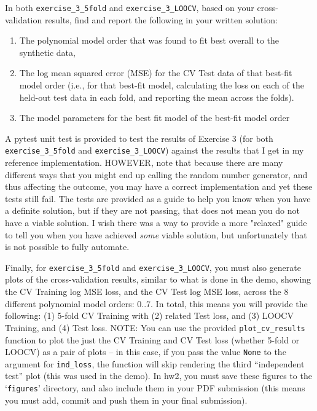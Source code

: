 \documentclass[10pt]{article}
\begin{document}
\begin{itemize}
In both {\tt exercise\_3\_5fold} and {\tt exercise\_3\_LOOCV}, based on your cross-validation results, find and report the following in your written solution:
\begin{enumerate}
\item The polynomial model order that was found to fit best overall to the synthetic data,
\item The log mean squared error (MSE) for the CV Test data of that best-fit model order (i.e., for that best-fit model, calculating the loss on each of the held-out test data in each fold, and reporting the mean across the folds).
\item The model parameters for the best fit model of the best-fit model order
\end{enumerate}

A pytest unit test is provided to test the results of Exercise 3 (for both {\tt exercise\_3\_5fold} and {\tt exercise\_3\_LOOCV}) against the results that I get in my reference implementation. HOWEVER, note that because there are many different ways that you might end up calling the random number generator, and thus affecting the outcome, you may have a correct implementation and yet these tests still fail. The tests are provided as a guide to help you know when you have a definite solution, but if they are not passing, that does not mean you do not have a viable solution. I wish there was a way to provide a more "relaxed" guide to tell you when you have achieved {\em some} viable solution, but unfortunately that is not possible to fully automate.

Finally, for {\tt exercise\_3\_5fold} and {\tt exercise\_3\_LOOCV}, you must also generate plots of the cross-validation results, similar to what is done in the demo, showing the CV Training log MSE loss, and the CV Test log MSE loss, across the 8 different polynomial model orders: 0..7. In total,  this means you will provide the following: (1) 5-fold CV Training with (2) related Test loss, and (3) LOOCV Training, and (4) Test loss. NOTE: You can use the provided {\tt plot\_cv\_results} function to plot the just the CV Training and CV Test loss (whether 5-fold or LOOCV) as a pair of plots -- in this case, if you pass the value {\tt None} to the argument for {\tt ind\_loss}, the function will skip rendering the third ``independent test'' plot (this was used in the demo). In hw2, you must save these figures to the `{\tt figures}' directory, and also include them in your PDF submission (this means you must add, commit and push them in your final submission).


\end{itemize}
\end{document}
